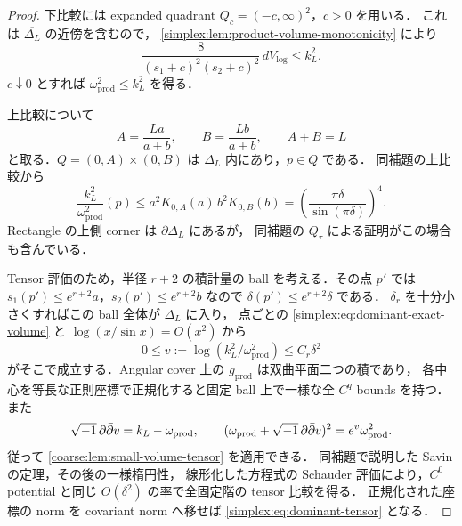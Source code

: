 \begin{proof}
下比較には expanded quadrant $Q_c=(-c,\infty)^2$，$c>0$ を用いる．
これは $\overline{\Delta_L}$ の近傍を含むので，
\cref{simplex:lem:product-volume-monotonicity} により
\[
 \frac8{(s_1+c)^2(s_2+c)^2}\,dV_{\log}\le k_L^2.
\]
$c\downarrow0$ とすれば $\omega_{\mathrm{prod}}^2\le k_L^2$ を得る．

上比較について
\[
 A=\frac{La}{a+b},\qquad B=\frac{Lb}{a+b},\qquad A+B=L
\]
と取る．$Q=(0,A)\times(0,B)$ は $\Delta_L$ 内にあり，$p\in Q$ である．
同補題の上比較から
\[
 \frac{k_L^2}{\omega_{\mathrm{prod}}^2}(p)
 \le a^2K_{0,A}(a)\,b^2K_{0,B}(b)
 =\left(\frac{\pi\delta}{\sin(\pi\delta)}\right)^4.
\]
Rectangle の上側 corner は $\partial\Delta_L$ にあるが，
同補題の $Q_\tau$ による証明がこの場合も含んでいる．

Tensor 評価のため，半径 $r+2$ の積計量の ball を考える．その点 $p'$ では
$s_1(p')\le e^{r+2}a$，$s_2(p')\le e^{r+2}b$ なので
$\delta(p')\le e^{r+2}\delta$ である．
$\delta_r$ を十分小さくすればこの ball 全体が $\Delta_L$ に入り，
点ごとの \eqref{simplex:eq:dominant-exact-volume} と
$\log(x/\sin x)=O(x^2)$ から
\[
 0\le v:=\log(k_L^2/\omega_{\mathrm{prod}}^2)
       \le C_r\delta^2
\]
がそこで成立する．Angular cover 上の $g_{\mathrm{prod}}$ は双曲平面二つの積であり，
各中心を等長な正則座標で正規化すると固定 ball 上で一様な全 $C^q$ bounds を持つ．
また
\[
 \sqrt{-1}\,\partial\bar\partial v=k_L-\omega_{\mathrm{prod}},\qquad
 (\omega_{\mathrm{prod}}+\sqrt{-1}\,\partial\bar\partial v)^2=e^v\omega_{\mathrm{prod}}^2.
\]
従って \cref{coarse:lem:small-volume-tensor} を適用できる．
同補題で説明した Savin の定理，その後の一様楕円性，
線形化した方程式の Schauder 評価により，$C^0$ potential と同じ
$O(\delta^2)$ の率で全固定階の tensor 比較を得る．
正規化された座標の norm を covariant norm へ移せば
\eqref{simplex:eq:dominant-tensor} となる．
\end{proof}

